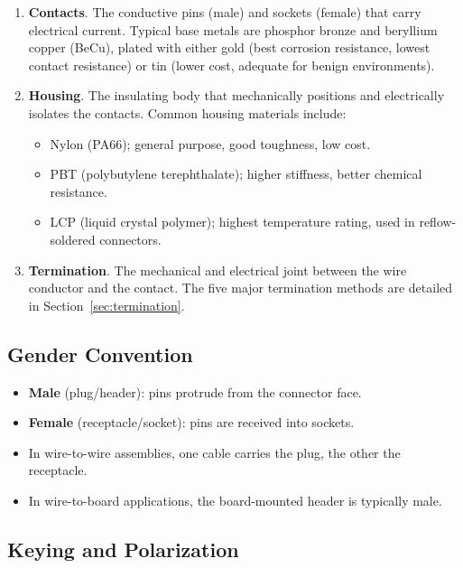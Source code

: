 \begin{enumerate}[leftmargin=1.5em]
  \item \textbf{Contacts}. The conductive pins (male) and sockets (female) that carry electrical current. Typical base metals are phosphor bronze and beryllium copper (BeCu), plated with either gold (best corrosion resistance, lowest contact resistance) or tin (lower cost, adequate for benign environments).

  \item \textbf{Housing}. The insulating body that mechanically positions and electrically isolates the contacts. Common housing materials include:
  \begin{itemize}[nosep]
    \item Nylon (PA66); general purpose, good toughness, low cost.
    \item PBT (polybutylene terephthalate); higher stiffness, better chemical resistance.
    \item LCP (liquid crystal polymer); highest temperature rating, used in reflow-soldered connectors.
  \end{itemize}

  \item \textbf{Termination}. The mechanical and electrical joint between the wire conductor and the contact. The five major termination methods are detailed in Section~\ref{sec:termination}.
\end{enumerate}

\subsection{Gender Convention}

\begin{itemize}[leftmargin=1.5em]
  \item \textbf{Male} (plug/header): pins protrude from the connector face.
  \item \textbf{Female} (receptacle/socket): pins are received into sockets.
  \item In wire-to-wire assemblies, one cable carries the plug, the other the receptacle.
  \item In wire-to-board applications, the board-mounted header is typically male.
\end{itemize}

\subsection{Keying and Polarization}

